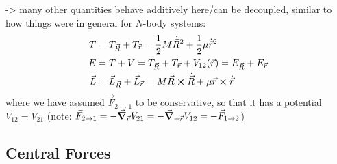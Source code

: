 \documentclass[../class_mech_main.tex]{subfiles}
\begin{document}
-> many other quantities behave additively here/can be decoupled, similar to how things were in general for $N$-body systems:
\begin{subequations}
	\begin{align}
		T &= T_{\vec{R}} + T_{\vec{r}} = \frac{1}{2} M \dot{\vec{R}}^2 + \frac{1}{2} \mu \dot{\vec{r}}^2
		\\
		E &= T + V = T_{\vec{R}} + T_{\vec{r}} + V_{12}(\vec{r}) = E_{\vec{R}} + E_{\vec{r}}
		\\
		\vec{L} &= \vec{L}_{\vec{R}} + \vec{L}_{\vec{r}} = M \vec{R} \cross \dot{\vec{R}} + \mu \vec{r} \cross \dot{\vec{r}}
	\end{align}
\end{subequations}
where we have assumed $\vec{F}_{2 \rightarrow 1}$ to be conservative, so that it has a potential $V_{12} = V_{21}$ (note: $\vec{F}_{2 \rightarrow 1} = - \grad_{\vec{r}} V_{21} = - \grad_{-\vec{r}} V_{12} = - \vec{F}_{1 \rightarrow 2}$)











	    \subsection{Central Forces}
		\label{sec:central_force}
\end{document}
